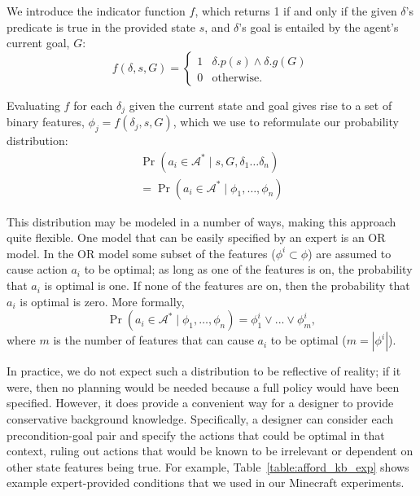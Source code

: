 \documentclass[letterpaper]{article}
\begin{document}
We introduce the indicator function $f$, which returns 1 if and only if the given $\delta$'s predicate is true in the provided state $s$, and $\delta$'s goal is entailed by the agent's current goal, $G$:
\begin{equation}
f(\delta, s, G) = 
\begin{cases}
1& \delta.p(s) \wedge \delta.g(G) \\
0& \text{otherwise.}
\end{cases}
\label{eq:f_func_def}
\end{equation}

Evaluating $f$ for each $\delta_j$ given the current state and goal gives rise to a set of binary features,
$\phi_j = f(\delta_j, s, G)$, which we use to reformulate our probability distribution:
\begin{multline}
\Pr(a_i \in \mathcal{A}^*  \mid s, G, \delta_1 \ldots \delta_n) \\
= \Pr(a_i \in \mathcal{A}^*  \mid \phi_1, \ldots, \phi_n)
\label{eq:feature_rep}
\end{multline}

This distribution may be modeled in a number of ways, making this
approach quite flexible. One model that can be easily specified by
an expert is an OR model.
In the OR model some subset of the features 
($\phi^i \subset \phi$) are
assumed to cause action $a_i$ to be optimal; as long as one of
the features is on, the probability that $a_i$ is optimal is one.
If none of the features are on, then the probability that $a_i$ is 
optimal is zero. More formally,
\begin{equation}
\Pr(a_i \in \mathcal{A}^*  \mid \phi_1, \ldots, \phi_n) = \phi_1^i \lor ... \lor \phi_m^i,
\end{equation}
where $m$ is the number of features that can cause $a_i$ to be optimal ($m = |\phi^i|$).

In practice, we do not expect such a distribution to be reflective of
reality; if it were, then no planning would be needed because a full
policy would have been specified. However, it does provide a
convenient way for a designer to provide conservative background
knowledge. Specifically, a designer can consider each precondition-goal
pair and specify the actions that could be optimal in that context, ruling
out actions that would be known to be irrelevant or dependent on other
state features being true. For example,
Table~\ref{table:afford_kb_exp} shows example expert-provided
conditions that we used in our Minecraft experiments.
\end{document}
